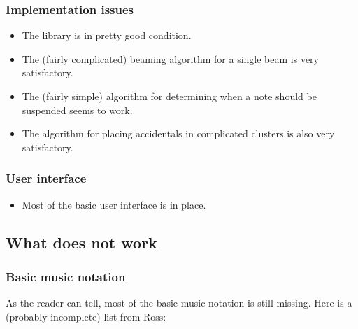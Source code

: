\subsubsection{Implementation issues}

\begin{itemize}
\item The {\obseq} library is in pretty good condition.
\item The (fairly complicated) beaming algorithm for a single beam is very satisfactory.
\item The (fairly simple) algorithm for determining when a note should
  be suspended seems to work. 
\item The algorithm for placing accidentals in complicated clusters is
  also very satisfactory.
\end{itemize}

\subsubsection{User interface}

\begin{itemize}
\item Most of the basic user interface is in place.
\end{itemize}

\subsection{What does not work}

\subsubsection{Basic music notation}

As the reader can tell, most of the basic music notation is still
missing.  Here is a (probably incomplete) list from Ross:

